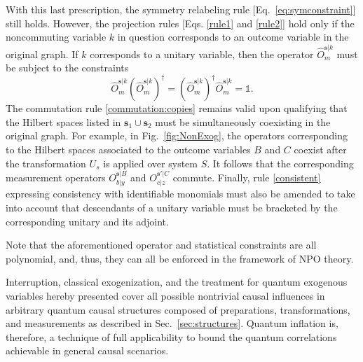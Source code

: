\documentclass[superscriptaddress,aps,prx,nofootinbib,twocolumn,twoside,reprint,letterpaper,longbibliography]{revtex4-2}
\def\id{\boldsymbol{\mathbb{1}}}
\begin{document}
With this last prescription, the symmetry relabeling rule [Eq.~\eqref{eq:symconstraint}] still holds. However, the projection rules [Eqs. \eqref{rule1} and \eqref{rule2}] hold only if the noncommuting variable $k$ in question corresponds to an outcome variable in the original graph. If $k$ corresponds to a unitary variable, then the operator $\hat{O}^{\boldsymbol{s}|k}_{m}$ must be subject to the constraints
\begin{equation}
\hat{O}^{\boldsymbol{s}|k}_{m}(\hat{O}^{\boldsymbol{s}|k}_{m})^\dagger=(\hat{O}^{\boldsymbol{s}|k}_{m})^\dagger\hat{O}^{\boldsymbol{s}|k}_{m}=\id.
\end{equation}
The commutation rule \eqref{commutation:copies} remains valid upon qualifying that the Hilbert spaces listed in $\boldsymbol{s}_1\cup\boldsymbol{s}_2$ must be simultaneously coexisting in the original graph.
For example, in Fig.~\ref{fig:NonExog}, the operators corresponding to the Hilbert spaces associated to the outcome variables $B$ and $C$ coexist after the transformation $U_s$ is applied over system $S$.
It follows that the corresponding measurement operators $O^{\boldsymbol{s}|B}_{b|y}$ and $O^{\boldsymbol{s}'|C}_{c|z}$ commute.
Finally, rule \eqref{consistent} expressing consistency with identifiable monomials must also be amended to take into account that descendants of a unitary variable must be bracketed by the corresponding unitary and its adjoint.

Note that the aforementioned operator and statistical constraints are all polynomial, and, thus, they can all be enforced in the framework of NPO theory.

Interruption, classical exogenization, and the treatment for quantum exogenous variables hereby presented cover all possible nontrivial causal influences in arbitrary quantum causal structures composed of preparations, transformations, and measurements as described in Sec.~\ref{sec:structures}. Quantum inflation is, therefore, a technique of full applicability to bound the quantum correlations achievable in general causal scenarios.
\end{document}
